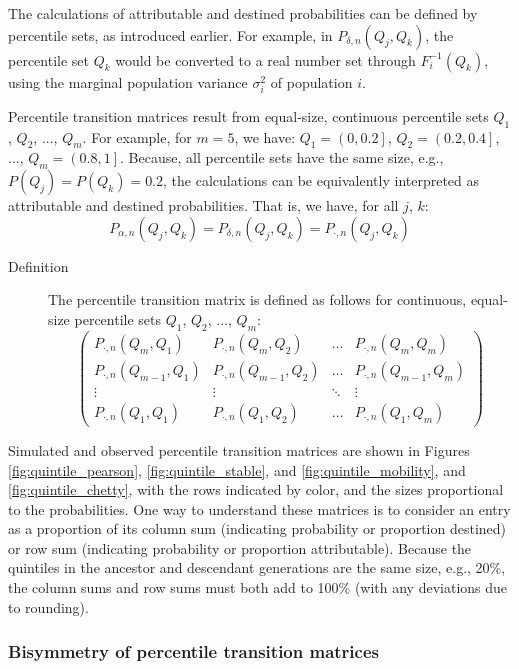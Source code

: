 \documentclass[a4paper,11pt]{article} %
\begin{document}
The calculations of attributable and destined probabilities can be defined by percentile sets, as introduced earlier. For example, in $P_{\delta , n}(Q_j, Q_k)$, the percentile set $Q_k$ would be converted to a real number set through $F_i^{-1}(Q_k)$, using the marginal population variance $\sigma_i^2$ of population $i$. 

Percentile transition matrices result from equal-size, continuous percentile sets $Q_1$, $Q_2$, ..., $Q_m$. For example, for $m=5$, we have: $Q_1 = \left(0, 0.2\right]$, $Q_2 = \left(0.2, 0.4\right]$, ..., $Q_m = \left(0.8, 1\right]$. Because, all percentile sets have the same size, e.g., $P(Q_j) = P(Q_k) = 0.2$, the calculations can be equivalently interpreted as attributable and destined probabilities. That is, we have, for all $j$, $k$:
$$P_{\alpha , n}(Q_j, Q_k) = P_{\delta , n}(Q_j, Q_k) = P_{\cdot , n}(Q_j, Q_k)$$

\begin{description}
\item [Definition] The percentile transition matrix is defined as follows for continuous, equal-size percentile sets $Q_1$, $Q_2$, ..., $Q_m$:
 $$
\begin{pmatrix}
P_{\cdot , n}(Q_m, Q_1) &  P_{\cdot , n}(Q_m, Q_2)  & \ldots & P_{\cdot , n}(Q_m, Q_m)\\
P_{\cdot , n}(Q_{m-1}, Q_1)  &  P_{\cdot , n}(Q_{m-1}, Q_2) & \ldots & P_{\cdot , n}(Q_{m-1}, Q_m)\\
\vdots & \vdots & \ddots & \vdots\\
P_{\cdot , n}(Q_1, Q_1)  &   P_{\cdot , n}(Q_1, Q_2)       &\ldots & P_{\cdot , n}(Q_1, Q_m)
\end{pmatrix}
$$
\end{description}
 
Simulated and observed percentile transition matrices are shown in Figures \ref{fig:quintile_pearson}, \ref{fig:quintile_stable}, and \ref{fig:quintile_mobility}, and \ref{fig:quintile_chetty}, with the rows indicated by color, and the sizes proportional to the probabilities. One way to understand these matrices is to consider an entry as a proportion of its column sum (indicating probability or proportion destined) or row sum (indicating probability or proportion attributable). Because the quintiles in the ancestor and descendant generations are the same size, e.g., 20\%, the column sums and row sums must both add to 100\% (with any deviations due to rounding). 

\subsubsection*{Bisymmetry of percentile transition matrices}
\end{document}
